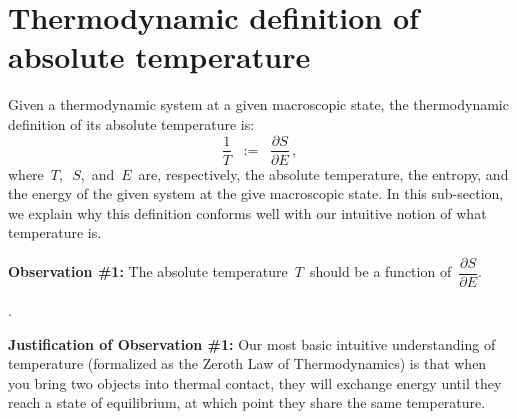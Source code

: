 
\vskip 0.5cm
\section{Thermodynamic definition of absolute temperature}


Given a thermodynamic system at a given macroscopic state,
the thermodynamic definition of its absolute temperature is:
\begin{equation*}
\dfrac{1}{T}
\;\; := \;\;
    \dfrac{\partial S}{\partial E}\,,
\end{equation*}
where
\,$T$,\, \,$S$,\, and \,$E$\,
are, respectively,
the absolute temperature, the entropy, and the energy
of the given system at the give macroscopic state.
In this sub-section, we explain why this definition
conforms well with our intuitive notion of what temperature is.

\vskip 0.6cm
\begin{center}
\begin{minipage}{4.5in}
\begin{tcolorbox}[arc=8px, colback=white, colframe=black]
\begin{center}
\vskip 0.1cm
\textbf{Observation \#1:}
\vskip 0.1cm
The absolute temperature \,$T$\,
should be a function of
\,$\dfrac{\partial S}{\partial E}$.\,
\end{center}
\vskip -0.5cm
{\color{white}.}
\end{tcolorbox}
\end{minipage}
\end{center}
\vskip 0.2cm
\noindent
\textbf{Justification of Observation \#1:}
\vskip 0.1cm
\noindent
Our most basic intuitive understanding of temperature
(formalized as the Zeroth Law of Thermodynamics) is that
when you bring two objects into thermal contact,
they will {\color{red}exchange energy} until they reach a state of equilibrium,
at which point they share the same temperature.

